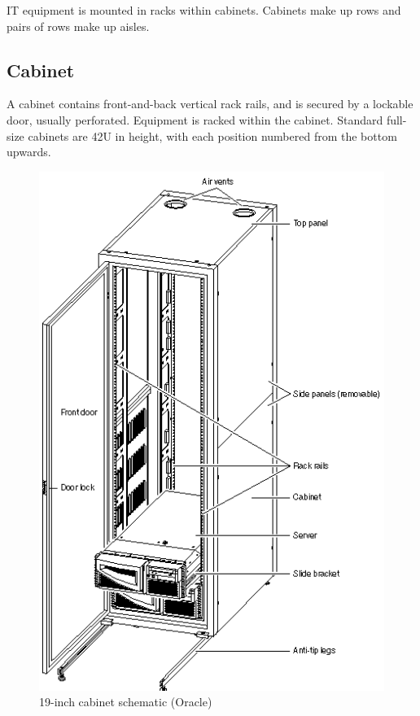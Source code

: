 IT equipment is mounted in racks within cabinets.
Cabinets make up rows and pairs of rows make up aisles.


\subsection{Cabinet}

A cabinet contains front-and-back vertical rack rails, and is secured by a lockable door, usually perforated.
Equipment is racked within the cabinet.
Standard full-size cabinets are 42U in height, with each position numbered from the bottom upwards.

\begin{figure}[htbp]
  \centering
  \includegraphics[width=1.0\linewidth,height=0.8\paperheight,keepaspectratio]{cabinet}
  \caption{19-inch cabinet schematic (Oracle)}
  \label{fig:cabinet}
\end{figure}

